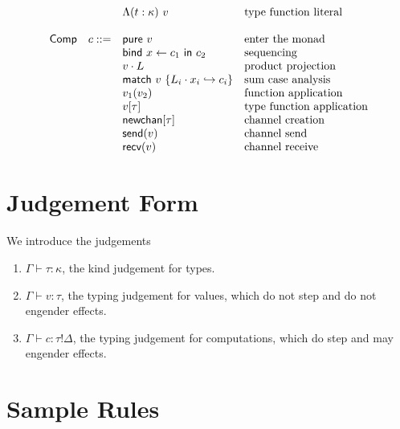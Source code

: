 \documentclass[12pt]{article}
\begin{document}
\[\begin{array}{l r l l}
                &            & \Lambda (t : \kappa) \ v          & \text{type function literal} \\
\\
\textsf{Comp}   &      c ::= & \textsf{pure} \ v                 & \text{enter the monad} \\
                &            & \textsf{bind} \ x \leftarrow c_1
                               \ \textsf{in} \ c_2               & \text{sequencing} \\
                &            & v \cdot L                         & \text{product projection} \\
                &            & \textsf{match} \ v \ \{
                               L_i \cdot x_i \hookrightarrow c_i
                               \}                                & \text{sum case analysis} \\
                &            & v_1 (v_2)                         & \text{function application} \\
                &            & v [\tau]                          & \text{type function application} \\
                &            & \textsf{newchan}[\tau]            & \text{channel creation} \\
                &            & \textsf{send}(v)                  & \text{channel send} \\
                &            & \textsf{recv}(v)                  & \text{channel receive} \\
\end{array}
\]

\newpage
\section{Judgement Form}

We introduce the judgements
\begin{enumerate}
\item $\Gamma \vdash \tau : \kappa$, the kind judgement for types.
\item $\Gamma \vdash v : \tau$, the typing judgement for values, which do not
step and do not engender effects.
\item $\Gamma \vdash c : \tau!\Delta$, the typing judgement for computations,
which do step and may engender effects.
\end{enumerate}

\newpage
\section{Sample Rules}
\end{document}
